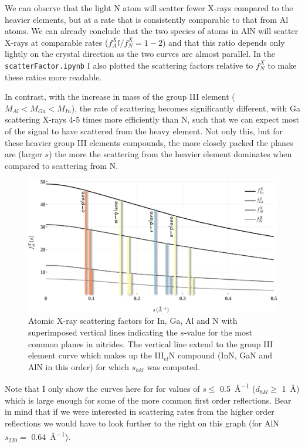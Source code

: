 We can observe that the light N atom will scatter fewer X-rays compared to the heavier elements, but at a rate that is consistently comparable to that from Al atoms. We can already conclude that the two species of atoms in AlN will scatter X-rays at comparable rates ($f^X_Al / f^X_N = 1-2 $) and that this ratio depends only lightly on the crystal direction as the two curves are almost parallel. In the \texttt{scatterFactor.ipynb} I also plotted the scattering factors relative to $f^X_{N}$ to make these ratios more readable.  

In contrast, with the increase in mass of the group III element ($M_{Al}<M_{Ga}<M_{In}$), the rate of scattering becomes significantly different, with Ga scattering X-rays 4-5 times more efficiently than N, such that we can expect most of the signal to have scattered from the heavy element. Not only this, but for these heavier group III elements compounds, the more closely packed the planes are (larger $s$) the more the scattering from the heavier element dominates when compared to scattering from N.


\begin{figure}
    \centering
\includegraphics[width=1\linewidth]{Figures/scatterFactorX.png}
\caption{Atomic X-ray scattering factors for In, Ga, Al and N with superimposed vertical lines indicating the $s$-value for the most common planes in nitrides. The vertical line extend to the group III element curve which makes up the III$_{el}$N compound (\ie InN, GaN and AlN in this order) for which $s_{hkl}$ was computed.}
\label{Fig:scatterFactorX}
\end{figure}

Note that I only show the curves here for for values of $s\leq$ \SI{0.5}{\angstrom^{-1}} ($d_{hkl}\geq$ \SI{1}{\angstrom}) which is large enough for some of the more common first order reflections. Bear in mind that if we were interested in scattering rates from the higher order reflections we would have to look further to the right on this graph (for AlN $s_{220} = $ \SI{0.64}{\angstrom^{-1}}).





